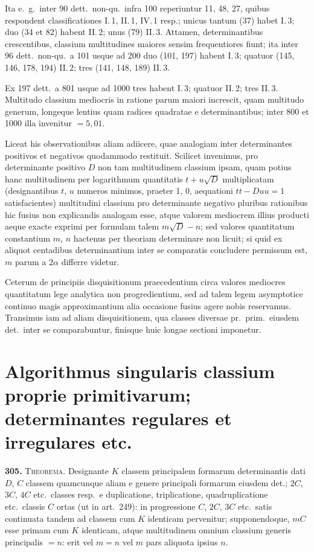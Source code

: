\documentclass[12pt,a4paper]{article}
\theoremstyle{plain}
\theoremstyle{definition}
\theoremstyle{remark}
\begin{document}
Ita e.~g.~inter 90 dett.~non-qu.~infra 100 reperiuntur 11, 48, 27, quibus respondent classificationes I.\,1, II.\,1, IV.\,1 resp.; unicus tantum (37) habet I.\,3; duo (34 et 82) habent II.\,2; unus (79) II.\,3. Attamen, determinantibus crescentibus, classium multitudines maiores sensim frequentiores fiunt; ita inter 96 dett.~non-qu.~a 101 usque ad 200 duo (101, 197) habent I.\,3; quatuor (145, 146, 178, 194) II.\,2; tres (141, 148, 189) II.\,3.

Ex 197 dett.~a 801 usque ad 1000 tres habent I.\,3; quatuor II.\,2; tres II.\,3. Multitudo classium mediocris in ratione parum maiori increscit, quam multitudo generum, longeque lentius quam radices quadratae e determinantibus; inter 800 et 1000 illa invenitur $= 5{,}01$.

Liceat his observationibus aliam adiicere, quae analogiam inter determinantes positivos et negativos quodammodo restituit. Scilicet invenimus, pro determinante positivo $D$ non tam multitudinem classium ipsam, quam potius hanc multitudinem per logarithmum quantitatis $t + u\sqrt{D}$ multiplicatam (designantibus $t$, $u$ numeros minimos, praeter 1, 0, aequationi $tt - Duu = 1$ satisfacientes) multitudini classium pro determinante negativo pluribus rationibus hic fusius non explicandis analogam esse, atque valorem mediocrem illius producti aeque exacte exprimi per formulam talem $m\sqrt{D} - n$; sed valores quantitatum constantium $m$, $n$ hactenus per theoriam determinare non licuit; si quid ex aliquot centadibus determinantium inter se comparatis concludere permissum est, $m$ parum a $2\alpha$ differre videtur.

Ceterum de principiis disquisitionum praecedentium circa valores mediocres quantitatum lege analytica non progredientium, sed ad talem legem asymptotice continuo magis approximantium alia occasione fusius agere nobis reservamus. Transimus iam ad aliam disquisitionem, qua classes diversae pr.~prim.~eiusdem det.~inter se comparabuntur, finisque huic longae sectioni imponetur.


\section*{Algorithmus singularis classium proprie primitivarum; determinantes regulares et irregulares etc.}

\textbf{305.} \textsc{Theorema.} Designante $K$ classem principalem formarum determinantis dati $D$, $C$ classem quamcunque aliam e genere principali formarum eiusdem det.; $2C$, $3C$, $4C$ etc.~classes resp.~e duplicatione, triplicatione, quadruplicatione etc.~classis $C$ ortas (ut in art.~249): in progressione $C$, $2C$, $3C$ etc.~satis continuata tandem ad classem cum $K$ identicam pervenitur; supponendoque, $mC$ esse primam cum $K$ identicam, atque multitudinem omnium classium generis principalis $= n$: erit vel $m = n$ vel $m$ pars aliquota ipsius $n$.
\end{document}

